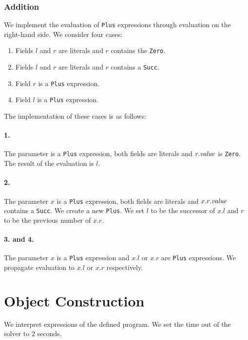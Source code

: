 \subsubsection{Addition}
We implement the evaluation of \texttt{Plus} expressions
through evaluation on the right-hand side.
We consider four cases:
\begin{enumerate}
  \item Fields $l$ and $r$ are literals and $r$ contains the  \texttt{Zero}.
  \item Fields $l$ and $r$ are literals and $r$ contains a  \texttt{Succ}.
  \item Field $r$ is a \texttt{Plus} expression.
  \item Field $l$ is a \texttt{Plus} expression.
\end{enumerate}
%
The implementation of these cases is as follows:
\paragraph{1.}
The parameter is a \texttt{Plus} expression,
both fields are literals and $r.\mathit{value}$ is \texttt{Zero}.
The result of the evaluation is $l$.

\paragraph{2.}
The parameter $x$ is a \texttt{Plus} expression,
both fields are literals and $x.r.\mathit{value}$ contains a \texttt{Succ}.
We create a new \texttt{Plus}.
We set $l$ to be the successor of $x.l$
and $r$ to be the previous number of $x.r$.

\paragraph{3. and 4.}
The parameter $x$ is a \texttt{Plus} expression
and $x.l$ or $x.r$ are \texttt{Plus} expressions.
We propagate evaluation to $x.l$ or $x.r$ respectively.

\section{Object Construction}
\label{sec:time-out}
We interpret expressions of the defined program.
We set the time out of the solver to $2$ seconds.

